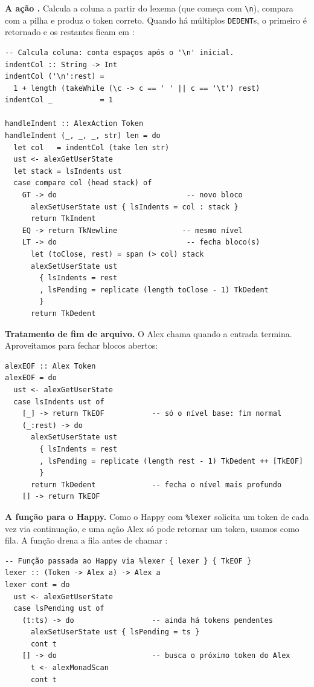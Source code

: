 \textbf{A ação .} Calcula a coluna a partir
do lexema (que começa com \verb|\n|), compara com a pilha e
produz o token correto. Quando há múltiplos \texttt{DEDENT}s,
o primeiro é retornado e os restantes ficam em :

\begin{verbatim}
-- Calcula coluna: conta espaços após o '\n' inicial.
indentCol :: String -> Int
indentCol ('\n':rest) =
  1 + length (takeWhile (\c -> c == ' ' || c == '\t') rest)
indentCol _           = 1

handleIndent :: AlexAction Token
handleIndent (_, _, _, str) len = do
  let col   = indentCol (take len str)
  ust <- alexGetUserState
  let stack = lsIndents ust
  case compare col (head stack) of
    GT -> do                              -- novo bloco
      alexSetUserState ust { lsIndents = col : stack }
      return TkIndent
    EQ -> return TkNewline               -- mesmo nível
    LT -> do                              -- fecha bloco(s)
      let (toClose, rest) = span (> col) stack
      alexSetUserState ust
        { lsIndents = rest
        , lsPending = replicate (length toClose - 1) TkDedent
        }
      return TkDedent
\end{verbatim}

\textbf{Tratamento de fim de arquivo.} O Alex chama 
quando a entrada termina. Aproveitamos para fechar blocos abertos:

\begin{verbatim}
alexEOF :: Alex Token
alexEOF = do
  ust <- alexGetUserState
  case lsIndents ust of
    [_] -> return TkEOF           -- só o nível base: fim normal
    (_:rest) -> do
      alexSetUserState ust
        { lsIndents = rest
        , lsPending = replicate (length rest - 1) TkDedent ++ [TkEOF]
        }
      return TkDedent             -- fecha o nível mais profundo
    [] -> return TkEOF
\end{verbatim}

\textbf{A função  para o Happy.} Como o Happy com
\verb|%lexer| solicita um token de cada vez via continuação, e
uma ação Alex só pode retornar um token, usamos 
como fila. A função  drena a fila antes de chamar
:

\begin{verbatim}
-- Função passada ao Happy via %lexer { lexer } { TkEOF }
lexer :: (Token -> Alex a) -> Alex a
lexer cont = do
  ust <- alexGetUserState
  case lsPending ust of
    (t:ts) -> do                  -- ainda há tokens pendentes
      alexSetUserState ust { lsPending = ts }
      cont t
    [] -> do                      -- busca o próximo token do Alex
      t <- alexMonadScan
      cont t
\end{verbatim}

